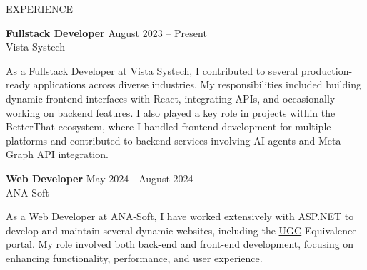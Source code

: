 \documentclass{resume} %
\begin{document}
\begin{rSection}{EXPERIENCE}

\textbf{Fullstack Developer} \hfill August 2023 – Present\\
Vista Systech

As a Fullstack Developer at Vista Systech, I contributed to several production-ready applications across diverse industries. My responsibilities included building dynamic frontend interfaces with React, integrating APIs, and occasionally working on backend features. I also played a key role in projects within the BetterThat ecosystem, where I handled frontend development for multiple platforms and contributed to backend services involving AI agents and Meta Graph API integration.




 
     


 
\textbf{Web Developer} \hfill May 2024 - August 2024\\
ANA-Soft 

As a Web Developer at ANA-Soft, I have worked extensively with ASP.NET to develop and maintain several dynamic websites, including the \href{https://ugc-equivalence.website-link.info/Login.aspx}{UGC} Equivalence portal. My role involved both back-end and front-end development, focusing on enhancing functionality, performance, and user experience. 

\end{rSection} 

\end{document}
